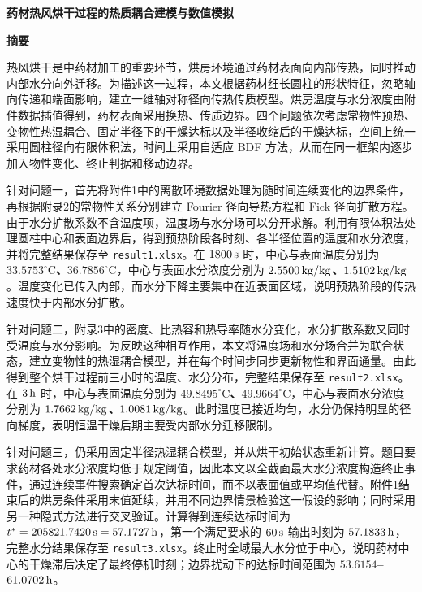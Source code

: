 \documentclass[UTF8,a4paper,12pt]{ctexart}
\begin{document}
\begin{center}
  {\fontsize{14pt}{18pt}\selectfont\bfseries 药材热风烘干过程的热质耦合建模与数值模拟}\par\vspace{10pt}
  {\fontsize{14pt}{18pt}\selectfont\bfseries 摘要}
\end{center}

热风烘干是中药材加工的重要环节，烘房环境通过药材表面向内部传热，同时推动内部水分向外迁移。为描述这一过程，本文根据药材细长圆柱的形状特征，忽略轴向传递和端面影响，建立一维轴对称径向传热传质模型。烘房温度与水分浓度由附件数据插值得到，药材表面采用换热、传质边界。四个问题依次考虑常物性预热、变物性热湿耦合、固定半径下的干燥达标以及半径收缩后的干燥达标，空间上统一采用圆柱径向有限体积法，时间上采用自适应 BDF 方法，从而在同一框架内逐步加入物性变化、终止判据和移动边界。

针对问题一，首先将附件1中的离散环境数据处理为随时间连续变化的边界条件，再根据附录2的常物性关系分别建立 Fourier 径向导热方程和 Fick 径向扩散方程。由于水分扩散系数不含温度项，温度场与水分场可以分开求解。利用有限体积法处理圆柱中心和表面边界后，得到预热阶段各时刻、各半径位置的温度和水分浓度，并将完整结果保存至 \texttt{result1.xlsx}。在 $1800\rm\,s$ 时，中心与表面温度分别为 \textbf{\boldmath$33.5753^\circ\mathrm C$、$36.7856^\circ\mathrm C$}，中心与表面水分浓度分别为 \textbf{\boldmath$2.5500\rm\,kg/kg$、$1.5102\rm\,kg/kg$}。温度变化已传入内部，而水分下降主要集中在近表面区域，说明预热阶段的传热速度快于内部水分扩散。

针对问题二，附录3中的密度、比热容和热导率随水分变化，水分扩散系数又同时受温度与水分影响。为反映这种相互作用，本文将温度场和水分场合并为联合状态，建立变物性的热湿耦合模型，并在每个时间步同步更新物性和界面通量。由此得到整个烘干过程前三小时的温度、水分分布，完整结果保存至 \texttt{result2.xlsx}。在 $3\rm\,h$ 时，中心与表面温度分别为 \textbf{\boldmath$49.8495^\circ\mathrm C$、$49.9664^\circ\mathrm C$}，中心与表面水分浓度分别为 \textbf{\boldmath$1.7662\rm\,kg/kg$、$1.0081\rm\,kg/kg$}。此时温度已接近均匀，水分仍保持明显的径向梯度，表明恒温干燥后期主要受内部水分迁移限制。

针对问题三，仍采用固定半径热湿耦合模型，并从烘干初始状态重新计算。题目要求药材各处水分浓度均低于规定阈值，因此本文以全截面最大水分浓度构造终止事件，通过连续事件搜索确定首次达标时间，而不以表面值或平均值代替。附件1结束后的烘房条件采用末值延续，并用不同边界情景检验这一假设的影响；同时采用另一种隐式方法进行交叉验证。计算得到连续达标时间为 \textbf{\boldmath$t^*=205821.7420\rm\,s=57.1727\rm\,h$}，第一个满足要求的 $60\rm\,s$ 输出时刻为 \textbf{\boldmath$57.1833\rm\,h$}，完整水分结果保存至 \texttt{result3.xlsx}。终止时全域最大水分位于中心，说明药材中心的干燥滞后决定了最终停机时刻；边界扰动下的达标时间范围为 \textbf{\boldmath$53.6154$--$61.0702\rm\,h$}。
\end{document}
